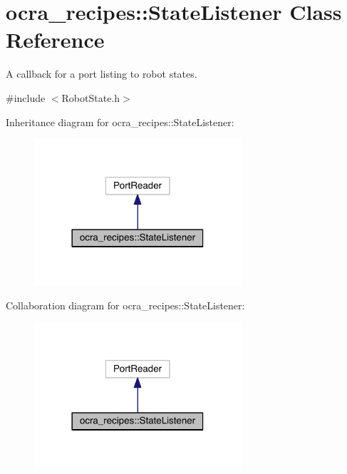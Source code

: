 \hypertarget{classocra__recipes_1_1StateListener}{}\section{ocra\+\_\+recipes\+:\+:State\+Listener Class Reference}
\label{classocra__recipes_1_1StateListener}


A callback for a port listing to robot states.  




{\ttfamily \#include $<$Robot\+State.\+h$>$}



Inheritance diagram for ocra\+\_\+recipes\+:\+:State\+Listener\+:\nopagebreak
\begin{figure}[H]
\begin{center}
\leavevmode
\includegraphics[width=218pt]{d8/db2/classocra__recipes_1_1StateListener__inherit__graph}
\end{center}
\end{figure}


Collaboration diagram for ocra\+\_\+recipes\+:\+:State\+Listener\+:\nopagebreak
\begin{figure}[H]
\begin{center}
\leavevmode
\includegraphics[width=218pt]{d1/d53/classocra__recipes_1_1StateListener__coll__graph}
\end{center}
\end{figure}
